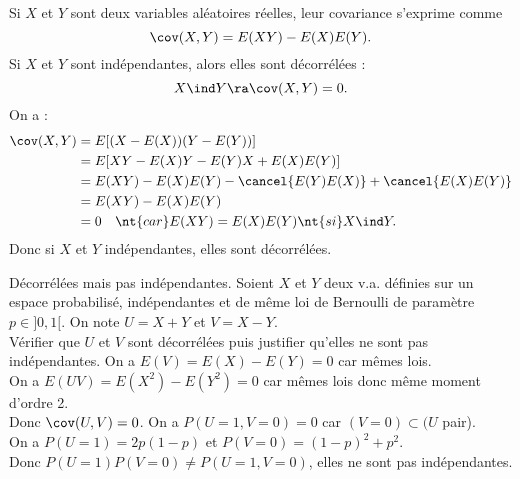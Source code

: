 \documentclass[11pt]{article}
\begin{document}
\begin{prop}{}{}
    Si $X$ et $Y$ sont deux variables aléatoires réelles, leur covariance s'exprime comme
    \begin{equation*}
        \cov(X,Y)=E(XY)-E(X)E(Y).
    \end{equation*}
    Si $X$ et $Y$ sont indépendantes, alors elles sont décorrélées :
    \begin{equation*}
        X \ind Y \ra \cov(X,Y)=0.
    \end{equation*}
    \tcblower
    On a :
    \begin{align*}
        \cov(X,Y)&=E[(X-E(X))(Y-E(Y))]\\
        &=E[XY-E(X)Y-E(Y)X+E(X)E(Y)]\\
        &=E(XY)-E(X)E(Y)-\cancel{E(Y)E(X)}+\cancel{E(X)E(Y)}\\
        &=E(XY)-E(X)E(Y)\\
        &=0 \quad \nt{car } E(XY)=E(X)E(Y) \nt{ si } X \ind Y.
    \end{align*}
    Donc si $X$ et $Y$ indépendantes, elles sont décorrélées.
\end{prop}

\begin{ex}{Décorrélées mais pas indépendantes.}{}
    Soient $X$ et $Y$ deux v.a. définies sur un espace probabilisé, indépendantes et de même loi de Bernoulli de paramètre $p\in]0,1[$. On note $U=X+Y$ et $V=X-Y$.\\
    Vérifier que $U$ et $V$ sont décorrélées puis justifier qu'elles ne sont pas indépendantes.
    \tcblower
    On a $E(V)=E(X)-E(Y)=0$ car mêmes lois.\\
    On a $E(UV)=E(X^2)-E(Y^2)=0$ car mêmes lois donc même moment d'ordre 2.\\
    Donc $\cov(U,V)=0$.\n
    On a $P(U=1,V=0)=0$ car $(V=0)\subset(U$ pair).\\
    On a $P(U=1)=2p(1-p)$ et $P(V=0)=(1-p)^2+p^2$.\\
    Donc $P(U=1)P(V=0)\neq P(U=1,V=0)$, elles ne sont pas indépendantes.
\end{ex}
\end{document}
